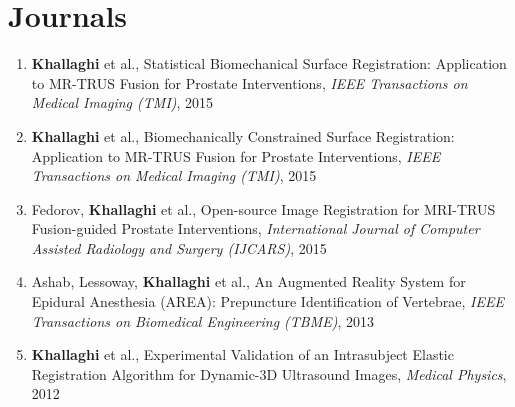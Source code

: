 \documentclass[letterpaper,11pt]{article}
\newcommand{\publicationItem}[4]{
  \item\small{
    {#1}{ et al., #2}{, \textit{#3}}{, #4}
  }
}
\newcommand{\publicationSubheadingListStart}{\begin{enumerate}[leftmargin=*]}
\newcommand{\publicationSubheadingListEnd}{\end{enumerate}}
\newcommand{\publicationSubItem}[4]{\publicationItem{#1}{#2}{#3}{#4}\vspace{-4pt}}
\begin{document}
\section{Journals}
  \publicationSubheadingListStart
    \publicationSubItem{\textbf{Khallaghi}}
      {Statistical Biomechanical Surface Registration: Application to MR-TRUS Fusion for Prostate Interventions}
      {IEEE Transactions on Medical Imaging (TMI)}{2015}
    \publicationSubItem{\textbf{Khallaghi}}
      {Biomechanically Constrained Surface Registration: Application to MR-TRUS Fusion for Prostate Interventions}
      {IEEE Transactions on Medical Imaging (TMI)}{2015}
    \publicationSubItem {Fedorov, \textbf{Khallaghi}}
      {Open-source Image Registration for MRI-TRUS Fusion-guided Prostate Interventions}
      {International Journal of Computer Assisted Radiology and Surgery (IJCARS)}{2015}
    \publicationSubItem{Ashab, Lessoway, \textbf{Khallaghi}}
      {An Augmented Reality System for Epidural Anesthesia (AREA): Prepuncture Identification of Vertebrae}
      {IEEE Transactions on Biomedical Engineering (TBME)}{2013}
    \publicationSubItem{\textbf{Khallaghi}}
      {Experimental Validation of an Intrasubject Elastic Registration Algorithm for Dynamic-3D Ultrasound Images}
      {Medical Physics}{2012}
  \publicationSubheadingListEnd
\end{document}
